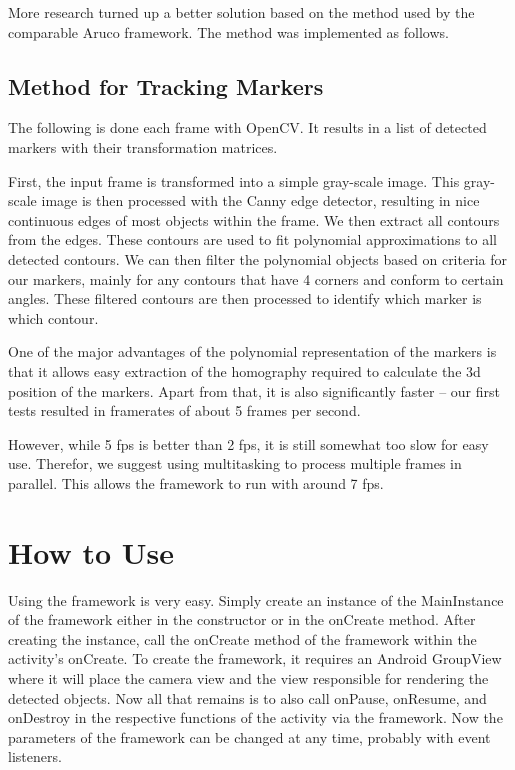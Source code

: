 More research turned up a better solution based on the method used by the comparable Aruco\cite{aruco} framework.
The method was implemented as follows.

\subsection{Method for Tracking Markers}

The following is done each frame with OpenCV.
It results in a list of detected markers with their transformation matrices.

First, the input frame is transformed into a simple gray-scale image.
This gray-scale image is then processed with the Canny\cite{canny} edge detector, resulting in nice continuous edges of most objects within the frame.
We then extract all contours from the edges.
These contours are used to fit polynomial approximations to all detected contours.
We can then filter the polynomial objects based on criteria for our markers, mainly for any contours that have 4 corners and conform to certain angles.
These filtered contours are then processed to identify which marker is which contour.

One of the major advantages of the polynomial representation of the markers is that it allows easy extraction of the homography required to calculate the 3d position of the markers.
Apart from that, it is also significantly faster – our first tests resulted in framerates of about 5 frames per second.

However, while 5 fps is better than 2 fps, it is still somewhat too slow for easy use.
Therefor, we suggest using multitasking to process multiple frames in parallel.
This allows the framework to run with around 7 fps.

\section{How to Use}

Using the framework is very easy.
Simply create an instance of the MainInstance of the framework either in the constructor or in the onCreate method.
After creating the instance, call the onCreate method of the framework within the activity's onCreate.
To create the framework, it requires an Android GroupView where it will place the camera view and the view responsible for rendering the detected objects.
Now all that remains is to also call onPause, onResume, and onDestroy in the respective functions of the activity via the framework.
Now the parameters of the framework can be changed at any time, probably with event listeners.
